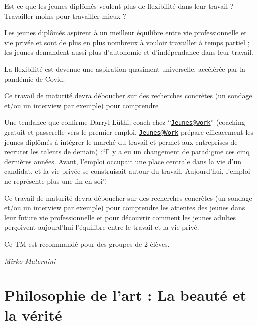 \documentclass[
  10pt,
  french,
  a5paper,
  openany]{book}
\newenvironment{signature}{\begin{flushright}}{\end{flushright}}
\begin{document}
Est-ce que les jeunes diplômés veulent plus de flexibilité dans leur travail ? Travailler moins pour travailler mieux ?

Les jeunes diplômés aspirent à un meilleur équilibre entre vie professionnelle et vie privée et sont de plus en plus nombreux à vouloir travailler à temps partiel ; les jeunes demandent aussi plus d'autonomie et d'indépendance dans leur travail.

La flexibilité est devenue une aspiration quasiment universelle, accélérée par la pandémie de Covid.

Ce travail de maturité devra déboucher sur des recherches concrètes (un sondage et/ou un interview par exemple) pour comprendre

Une tendance que confirme Darryl Lüthi, coach chez ``\href{mailto:Jeunes@work}{\nolinkurl{Jeunes@work}}'' (coaching gratuit et passerelle vers le premier emploi, \href{mailto:Jeunes@Work}{\nolinkurl{Jeunes@Work}} prépare efficacement les jeunes diplômés à intégrer le marché du travail et permet aux entreprises de recruter les talents de demain) :``Il y a eu un changement de paradigme ces cinq dernières années. Avant, l'emploi occupait une place centrale dans la vie d'un candidat, et la vie privée se construisait autour du travail. Aujourd'hui, l'emploi ne représente plus une fin en soi''.

Ce travail de maturité devra déboucher sur des recherches concrètes (un sondage et/ou un interview par exemple) pour comprendre les attentes des jeunes dans leur future vie professionnelle et pour découvrir comment les jeunes adultes perçoivent aujourd'hui l'équilibre entre le travail et la vie privé.

Ce TM est recommandé pour des groupes de 2 élèves.

\begin{signature}
\emph{Mirko Maternini}

\end{signature}

\hypertarget{philosophie-de-lart-la-beautuxe9-et-la-vuxe9rituxe9}{%
\chapter{Philosophie de l'art : La beauté et la vérité}\label{philosophie-de-lart-la-beautuxe9-et-la-vuxe9rituxe9}}
\end{document}
